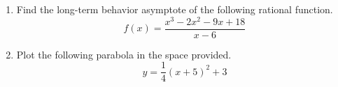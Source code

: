 \documentclass{article}
\begin{document}
\begin{enumerate}
\begin{center}
\CartesianPlane[axes=yes,h=10,w=10]
\end{center} \vspace{1cm}

\newpage

\item Find the long-term behavior asymptote of the following rational function. \[ f(x) = \frac{x^3 - 2x^2 - 9x + 18}{x - 6} \] \vspace{6cm}

\item Plot the following parabola in the space provided. \[ y = \frac{1}{4} \left(x + 5\right)^2 +3 \]

\begin{center}
\CartesianPlane[axes=yes,h=10,w=10]
\end{center} \vspace{1cm}
\end{enumerate}
\end{document}
